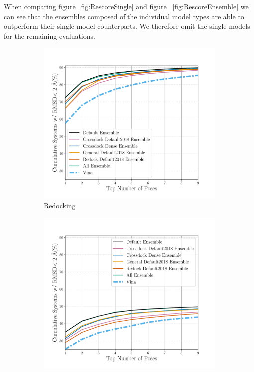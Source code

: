 \documentclass[journal=jcisd8,manuscript=article]{achemso}
\begin{document}
When comparing figure~\ref{fig:RescoreSingle} and figure ~\ref{fig:RescoreEnsemble} we can see that the ensembles composed of the individual model types are able to outperform their single model counterparts. We therefore omit the single models for the remaining evaluations.

\begin{figure}
	\begin{subfigure}[b]{0.48\textwidth}
		\centering
		\includegraphics[width=\textwidth]{figures/redocking/rescore_ensembles_line.pdf}
		\caption{Redocking}
		\label{fig:RescoreEnsembleRedock}
        \end{subfigure}    
	\begin{subfigure}[b]{0.48\textwidth} 
		\centering
		\includegraphics[width=\textwidth]{figures/crossdocking/rescore_ensembles_line.pdf}

\end{subfigure}
\end{figure}
\end{document}
